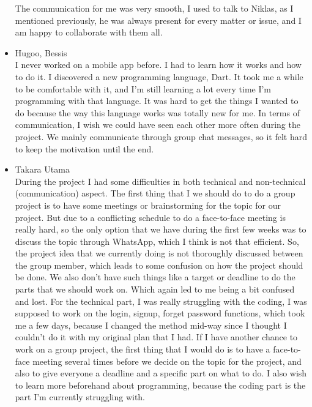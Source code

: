 \documentclass[10pt]{article}
\begin{document}
\begin{multicols*}{2}
\begin{itemize}
  The communication for me was very smooth, I used to talk to Niklas, as I mentioned previously, he was always present for every matter or issue, and I am happy to collaborate with them all. 

  \item {Hugoo, Bessis}\\
  I never worked on a mobile app before. I had to learn how it works and how to do it. I discovered a new programming language, Dart. It took me a while to be comfortable with it, and I'm still learning a lot every time I'm programming with that language. It was hard to get the things I wanted to do because the way this language works was totally new for me.
  In terms of communication, I wish we could have seen each other more often during the project. We mainly communicate through group chat messages, so it felt hard to keep the motivation until the end.
  
  \item {Takara Utama}\\
  During the project I had some difficulties in both technical and non-technical (communication) aspect. The first thing that I we should do to do a group project is to have some meetings or brainstorming for the topic for our project. But due to a conflicting schedule to do a face-to-face meeting is really hard, so the only option that we have during the first few weeks was to discuss the topic through WhatsApp, which I think is not that efficient. So, the project idea that we currently doing is not thoroughly discussed between the group member, which leads to some confusion on how the project should be done. We also don’t have such things like a target or deadline to do the parts that we should work on. Which again led to me being a bit confused and lost. For the technical part, I was really struggling with the coding, I was supposed to work on the login, signup, forget password functions, which took me a few days, because I changed the method mid-way since I thought I couldn’t do it with my original plan that I had. If I have another chance to work on a group project, the first thing that I would do is to have a face-to-face meeting several times before we decide on the topic for the project, and also to give everyone a deadline and a specific part on what to do. I also wish to learn more beforehand about programming, because the coding part is the part I'm currently struggling with. 
  

\end{itemize}
\end{multicols*}
\end{document}
